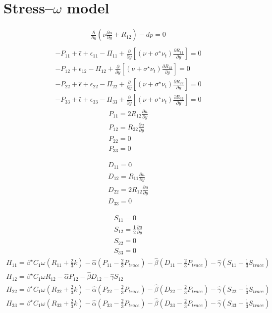 \documentclass[%
notitlepage,
]{revtex4-1}
\newcommand{\pd}[2]{\frac{\partial #1}{\partial #2}}
\begin{document}
\section{Stress--$\omega$ model}
\begin{eqnarray}
  \pd{}{y}\left(\nu \pd{u}{y} + R_{12}\right) - dp = 0\\
\end{eqnarray}
\begin{eqnarray}
  -P_{11} + \hat{\epsilon} + \epsilon_{11} - \Pi_{11} + \pd{}{y}\left[\left(\nu + \sigma^{\star} \nu_t\right)\pd{R_{11}}{y}\right] = 0\\ 
  -P_{12} + \epsilon_{12} - \Pi_{12} + \pd{}{y}\left[\left(\nu + \sigma^{\star} \nu_t\right)\pd{R_{12}}{y}\right] = 0 \\
 -P_{22} + \hat{\epsilon} + \epsilon_{22} - \Pi_{22} + \pd{}{y}\left[\left(\nu + \sigma^{\star} \nu_t\right)\pd{R_{22}}{y}\right] = 0\\
 -P_{33} + \hat{\epsilon} + \epsilon_{33} - \Pi_{33} + \pd{}{y}\left[\left(\nu + \sigma^{\star} \nu_t\right)\pd{R_{33}}{y}\right] = 0 
\end{eqnarray}
\begin{eqnarray}
  P_{11} = 2 R_{12}\pd{u}{y}\\ 
  P_{12} = R_{22}\pd{u}{y}\\ 
  P_{22} = 0\\
  P_{33} = 0
\end{eqnarray}

\begin{eqnarray}
  D_{11} = 0\\
  D_{12} = R_{11}\pd{u}{y}\\ 
  D_{22} = 2 R_{12}\pd{u}{y}\\ 
  D_{33} = 0
\end{eqnarray}

\begin{eqnarray}
  S_{11} = 0\\
  S_{12} = \frac{1}{2}\pd{u}{y}\\
  S_{22} = 0\\
  S_{33} = 0
\end{eqnarray}
\begin{eqnarray}
  \Pi_{11} = \beta^{\star}C_1\omega\left(R_{11} + \frac{2}{3}k\right) - \hat{\alpha}\left(P_{11} - \frac{2}{3}P_{trace}\right) - \hat{\beta}\left(D_{11} - \frac{2}{3}P_{trace}\right) - \hat{\gamma}\left(S_{11} - \frac{1}{3}S_{trace}\right)\\
  \Pi_{12} = \beta^{\star}C_1\omega R_{12} - \hat{\alpha} P_{12} - \hat{\beta} D_{12}- \hat{\gamma} S_{12}\\
  \Pi_{22} = \beta^{\star}C_1\omega\left(R_{22} + \frac{2}{3}k\right) - \hat{\alpha}\left(P_{22} - \frac{2}{3}P_{trace}\right) - \hat{\beta}\left(D_{22} - \frac{2}{3}P_{trace}\right) - \hat{\gamma}\left(S_{22} - \frac{1}{3}S_{trace}\right)\\
  \Pi_{33} = \beta^{\star}C_1\omega\left(R_{33} + \frac{2}{3}k\right) - \hat{\alpha}\left(P_{33} - \frac{2}{3}P_{trace}\right) - \hat{\beta}\left(D_{33} - \frac{2}{3}P_{trace}\right) - \hat{\gamma}\left(S_{33} - \frac{1}{3}S_{trace}\right)\\
\end{eqnarray}
\end{document}

